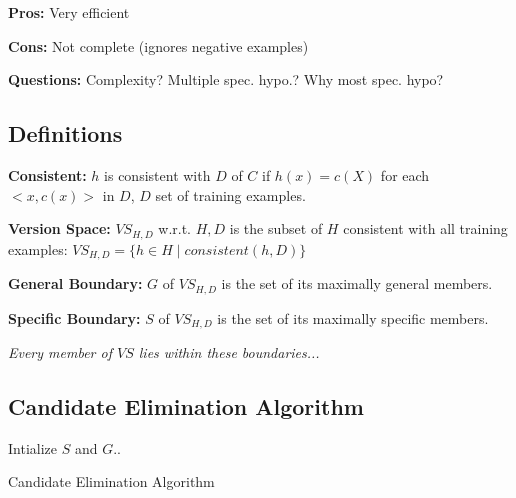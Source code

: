 \documentclass[fleqn, oneside, 10pt, titlepage]{article}
\begin{document}
\textbf{Pros:} Very efficient

\textbf{Cons:} Not complete (ignores negative examples)

\textbf{Questions:} Complexity? Multiple spec. hypo.? Why most spec. hypo?

\subsection{Definitions}

\textbf{Consistent:} $h$ is consistent with $D$ of $C$ if $h(x) = c(X)$ for each $<x, c(x)>$ in $D$, $D$ set of training examples.

\textbf{Version Space:} $VS_{H,D}$ w.r.t. $H, D$ is the subset of $H$ consistent with all training examples: $VS_{H,D} = \{h\in H \mid consistent(h,D)\}$

\textbf{General Boundary:} $G$ of $VS_{H,D}$ is the set of its maximally general members.

\textbf{Specific Boundary:} $S$ of $VS_{H,D}$ is the set of its maximally specific members.

\textit{Every member of $VS$ lies within these boundaries...}

\subsection{Candidate Elimination Algorithm}
Intialize $S$ and $G$..
\begin{algorithm}
\caption{Candidate Elimination Algorithm}
	\SetAlgoLined
\end{algorithm}
\end{document}
